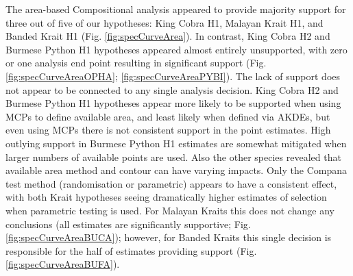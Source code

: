 \documentclass[10pt,a4paper]{article}
\begin{document}
The area-based Compositional analysis appeared to provide majority support for three out of five of our hypotheses: King Cobra H1, Malayan Krait H1, and Banded Krait H1 (Fig. \ref{fig:specCurveArea}).
In contrast, King Cobra H2 and Burmese Python H1 hypotheses appeared almost entirely unsupported, with zero or one analysis end point resulting in significant support (Fig. \ref{fig:specCurveAreaOPHA}; \ref{fig:specCurveAreaPYBI}).
The lack of support does not appear to be connected to any single analysis decision.
King Cobra H2 and Burmese Python H1 hypotheses appear more likely to be supported when using MCPs to define available area, and least likely when defined via AKDEs, but even using MCPs there is not consistent support in the point estimates.
High outlying support in Burmese Python H1 estimates are somewhat mitigated when larger numbers of available points are used.
Also the other species revealed that available area method and contour can have varying impacts.
Only the Compana test method (randomisation or parametric) appears to have a consistent effect, with both Krait hypotheses seeing dramatically higher estimates of selection when parametric testing is used.
For Malayan Kraits this does not change any conclusions (all estimates are significantly supportive; Fig. \ref{fig:specCurveAreaBUCA}); however, for Banded Kraits this single decision is responsible for the half of estimates providing support (Fig. \ref{fig:specCurveAreaBUFA}).
\end{document}
